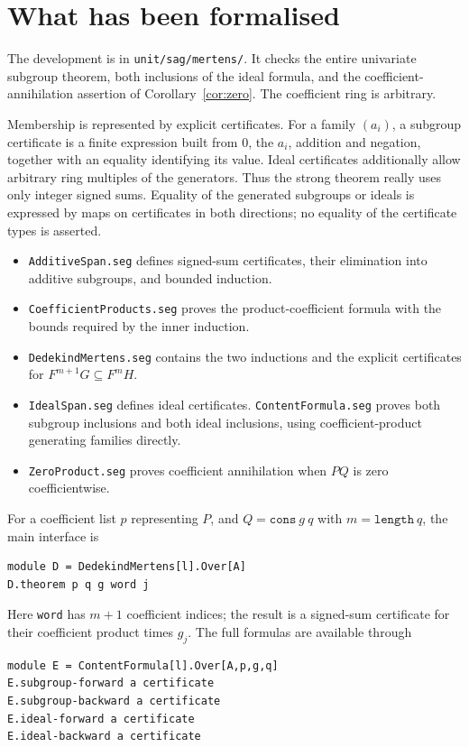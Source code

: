 \documentclass[11pt]{amsart}
\newcommand{\code}[1]{\texttt{#1}}
\begin{document}
\section{What has been formalised}

The development is in \code{unit/sag/mertens/}. It checks the entire
univariate subgroup theorem, both inclusions of the ideal formula,
and the coefficient-annihilation assertion of Corollary~\ref{cor:zero}.
The coefficient ring is arbitrary.

Membership is represented by explicit certificates. For a family
$(a_i)$, a subgroup certificate is a finite expression built from
$0$, the $a_i$, addition and negation, together with an equality
identifying its value. Ideal certificates additionally allow arbitrary
ring multiples of the generators. Thus the strong theorem really
uses only integer signed sums. Equality of the generated subgroups
or ideals is expressed by maps on certificates in both directions;
no equality of the certificate types is asserted.

\begin{itemize}
\item \code{AdditiveSpan.seg} defines signed-sum certificates,
their elimination into additive subgroups, and bounded induction.
\item \code{CoefficientProducts.seg} proves the product-coefficient
formula with the bounds required by the inner induction.
\item \code{DedekindMertens.seg} contains the two inductions and
the explicit certificates for $F^{m+1}G\subseteq F^mH$.
\item \code{IdealSpan.seg} defines ideal certificates.
\code{ContentFormula.seg} proves both subgroup inclusions and both
ideal inclusions, using coefficient-product generating families
directly.
\item \code{ZeroProduct.seg} proves coefficient annihilation when
$PQ$ is zero coefficientwise.
\end{itemize}

For a coefficient list $p$ representing $P$, and $Q=\code{cons}\ g\ q$
with $m=\code{length}\ q$, the main interface is
\begin{verbatim}
module D = DedekindMertens[l].Over[A]
D.theorem p q g word j
\end{verbatim}
Here \code{word} has $m+1$ coefficient indices; the result is a
signed-sum certificate for their coefficient product times $g_j$.
The full formulas are available through
\begin{verbatim}
module E = ContentFormula[l].Over[A,p,g,q]
E.subgroup-forward a certificate
E.subgroup-backward a certificate
E.ideal-forward a certificate
E.ideal-backward a certificate
\end{verbatim}
\end{document}

